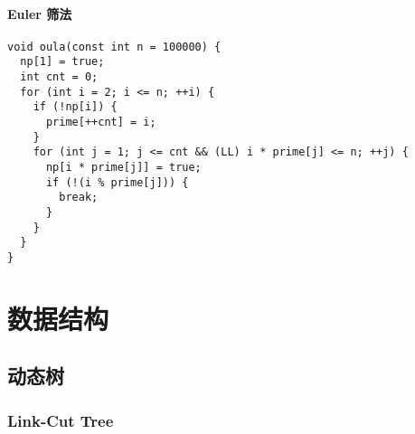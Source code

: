 \documentclass[a4paper,11pt,twoside,fontset = fandol,UTF8]{ctexbook} %
\begin{document}
\subsubsection{Euler 筛法}

\begin{lstlisting}
void oula(const int n = 100000) {
  np[1] = true;
  int cnt = 0;
  for (int i = 2; i <= n; ++i) {
    if (!np[i]) {
      prime[++cnt] = i;
    }
    for (int j = 1; j <= cnt && (LL) i * prime[j] <= n; ++j) {
      np[i * prime[j]] = true;
      if (!(i % prime[j])) {
        break;
      }
    }
  }
}
\end{lstlisting}

\chapter{数据结构}

\section{动态树}

\subsection{Link-Cut Tree}
\end{document}
